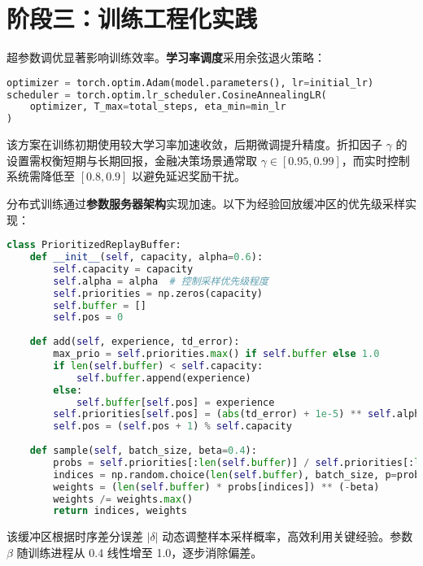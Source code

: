 \section{阶段三：训练工程化实践}
超参数调优显著影响训练效率。\textbf{学习率调度}采用余弦退火策略：\par
\begin{lstlisting}[language=python]
optimizer = torch.optim.Adam(model.parameters(), lr=initial_lr)
scheduler = torch.optim.lr_scheduler.CosineAnnealingLR(
    optimizer, T_max=total_steps, eta_min=min_lr
)
\end{lstlisting}
该方案在训练初期使用较大学习率加速收敛，后期微调提升精度。折扣因子 $\gamma$ 的设置需权衡短期与长期回报，金融决策场景通常取 $\gamma \in [0.95, 0.99]$，而实时控制系统需降低至 $[0.8, 0.9]$ 以避免延迟奖励干扰。\par
分布式训练通过\textbf{参数服务器架构}实现加速。以下为经验回放缓冲区的优先级采样实现：\par
\begin{lstlisting}[language=python]
class PrioritizedReplayBuffer:
    def __init__(self, capacity, alpha=0.6):
        self.capacity = capacity
        self.alpha = alpha  # 控制采样优先级程度
        self.priorities = np.zeros(capacity)
        self.buffer = []
        self.pos = 0
        
    def add(self, experience, td_error):
        max_prio = self.priorities.max() if self.buffer else 1.0
        if len(self.buffer) < self.capacity:
            self.buffer.append(experience)
        else:
            self.buffer[self.pos] = experience
        self.priorities[self.pos] = (abs(td_error) + 1e-5) ** self.alpha
        self.pos = (self.pos + 1) % self.capacity
    
    def sample(self, batch_size, beta=0.4):
        probs = self.priorities[:len(self.buffer)] / self.priorities[:len(self.buffer)].sum()
        indices = np.random.choice(len(self.buffer), batch_size, p=probs)
        weights = (len(self.buffer) * probs[indices]) ** (-beta)
        weights /= weights.max()
        return indices, weights
\end{lstlisting}
该缓冲区根据时序差分误差 $|\delta|$ 动态调整样本采样概率，高效利用关键经验。参数 $\beta$ 随训练进程从 0.4 线性增至 1.0，逐步消除偏差。\par
